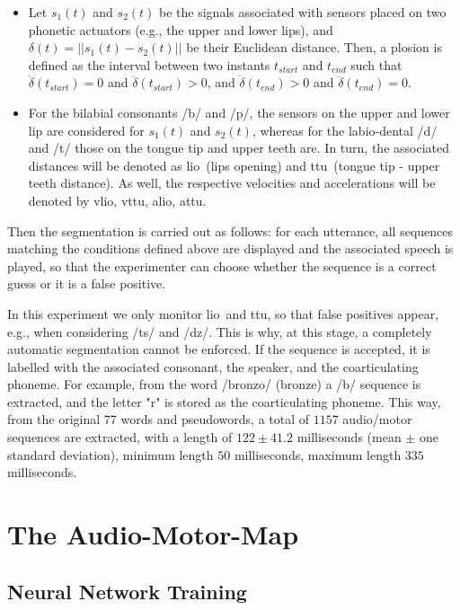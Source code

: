\documentclass[10pt]{article}
\newcommand{\lio}{\textsf{lio}}
\newcommand{\ttu}{\textsf{ttu}}
\newcommand{\vlio}{\textsf{vlio}}
\newcommand{\vttu}{\textsf{vttu}}
\newcommand{\alio}{\textsf{alio}}
\newcommand{\attu}{\textsf{attu}}
\begin{document}
\begin{itemize}

  \item Let $s_1(t)$ and $s_2(t)$ be the signals associated
    with sensors placed on two phonetic actuators (e.g., the upper and
    lower lips), and $\delta(t) = ||s_1(t)-s_2(t)||$ be their
    Euclidean distance. Then, a plosion is defined as the interval
    between two instants $t_{start}$ and $t_{end}$ such that
    $\dot{\delta}(t_{start}) = 0 $ and $\ddot{\delta}(t_{start}) > 0$,
    and $\dot{\delta}(t_{end}) > 0 $ and $\ddot{\delta}(t_{end}) = 0$.

  \item For the bilabial consonants /b/ and /p/, the sensors on the upper and lower
    lip are considered for $s_1(t)$ and $s_2(t)$, whereas for the labio-dental /d/ and /t/
    those on the tongue tip and upper teeth are. In turn, the associated
    distances will be denoted as \lio\ (lips opening) and \ttu\
    (tongue tip - upper teeth distance). As well, the respective velocities
    and accelerations will be denoted by \vlio, \vttu, \alio, \attu.

\end{itemize}

Then the segmentation is carried out as follows: for each
utterance, all sequences matching the conditions defined above
are displayed and the associated speech is played, so that the experimenter 
can choose whether the
sequence is a correct guess or it is a false positive.

 In this experiment we only
monitor \lio\ and \ttu, so that false positives appear, e.g., when considering
/ts/ and /dz/. This is why, at this stage, a completely automatic segmentation
cannot be enforced. If the sequence is accepted, it is labelled
with the associated consonant, the speaker, and the
coarticulating phoneme. For example, from the word /bronzo/ (bronze) a /b/
sequence is extracted, and the letter "r" is stored as the coarticulating phoneme.
This way, from the original $77$ words and pseudowords, a total
of $1157$ audio/motor sequences are extracted, with a length of $122 \pm 41.2$
milliseconds (mean $\pm$ one standard deviation), minimum length $50$ milliseconds,
maximum length $335$ milliseconds.

\section{The Audio-Motor-Map}
\subsection{Neural Network Training}
\end{document}
